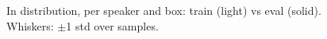 \begin{figure}[t]
\centering

\caption{In distribution, per speaker and box: train (light) vs eval (solid). Whiskers: $\pm$1 std over samples.}
\label{fig:speaker_train_eval}
\end{figure}
